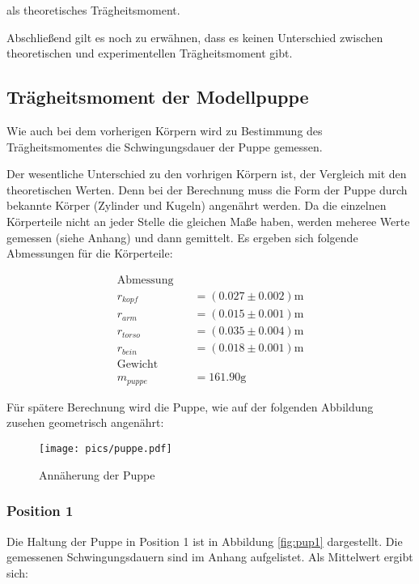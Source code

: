 als theoretisches Trägheitsmoment.

Abschließend gilt es noch zu erwähnen, dass es keinen Unterschied
zwischen theoretischen und experimentellen Trägheitsmoment gibt. %

\subsection{Trägheitsmoment der Modellpuppe}

Wie auch bei dem vorherigen Körpern wird zu Bestimmung des Trägheitsmomentes
die Schwingungsdauer der Puppe gemessen. %

Der wesentliche Unterschied zu den vorhrigen Körpern ist, der Vergleich mit den
theoretischen Werten. %
Denn bei der Berechnung muss die Form der Puppe
durch bekannte Körper (Zylinder und Kugeln) angenährt werden.
Da die einzelnen Körperteile nicht an jeder Stelle die gleichen Maße haben,
werden meheree Werte gemessen (siehe Anhang) und dann gemittelt.
Es ergeben sich folgende Abmessungen für die Körperteile:

\begin{align*}
\text{Abmessung} \quad &\\
r_{kopf}&=\left(\num{0.027}\pm\num{0.002}\right)\si{\meter}\\
r_{arm}&=\left(\num{0.015}\pm\num{0.001}\right)\si{\meter}\\
r_{torso}&=\left(\num{0.035}\pm\num{0.004}\right)\si{\meter}\\
r_{bein}&=\left(\num{0.018}\pm\num{0.001}\right)\si{\meter}\\
\text{Gewicht} \quad &\\
m_{puppe}&=\num{161.90}\si{\gram}
\end{align*}

Für spätere Berechnung wird die Puppe, wie auf der folgenden Abbildung zusehen geometrisch angenährt: %


\begin{figure}
  \centering
  \texttt{[image: pics/puppe.pdf]}
  \caption{Annäherung der Puppe}
  \label{fig:approx_puppe}
\end{figure}

\subsubsection{Position 1}

Die Haltung der Puppe in Position 1 ist in Abbildung \ref{fig:pup1} dargestellt.
Die gemessenen Schwingungsdauern sind im Anhang aufgelistet.
Als Mittelwert ergibt sich:

